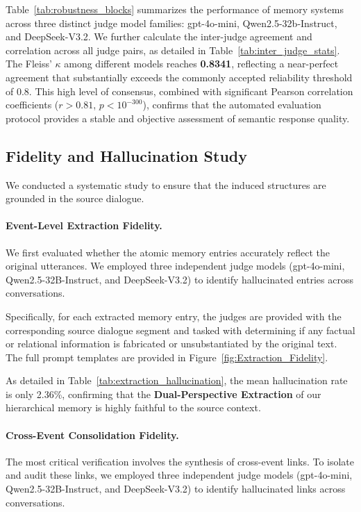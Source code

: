 Table~\ref{tab:robustness_blocks} summarizes the performance of memory systems across three distinct judge model families: gpt-4o-mini, Qwen2.5-32b-Instruct, and DeepSeek-V3.2. We further calculate the inter-judge agreement and correlation across all judge pairs, as detailed in Table~\ref{tab:inter_judge_stats}. The Fleiss' $\kappa$ among different models reaches \textbf{0.8341}, reflecting a near-perfect agreement that substantially exceeds the commonly accepted reliability threshold of 0.8. This high level of consensus, combined with significant Pearson correlation coefficients ($r > 0.81$, $p < 10^{-300}$), confirms that the automated evaluation protocol provides a stable and objective assessment of semantic response quality.

\subsection{Fidelity and Hallucination Study}\label{appendix:fidelity}

We conducted a systematic study to ensure that the induced structures are grounded in the source dialogue. 



\paragraph{Event-Level Extraction Fidelity.} We first evaluated whether the atomic memory entries  accurately reflect the original utterances. We employed three independent judge models (gpt-4o-mini, Qwen2.5-32B-Instruct, and DeepSeek-V3.2) to identify hallucinated entries across conversations. 

Specifically, for each extracted memory entry, the judges are provided with the corresponding source dialogue segment and tasked with determining if any factual or relational information is fabricated or unsubstantiated by the original text. The full prompt templates are provided in Figure~\ref{fig:Extraction_Fidelity}.

As detailed in Table~\ref{tab:extraction_hallucination}, the mean hallucination rate is only 2.36\%, confirming that the \textbf{Dual-Perspective Extraction} of our hierarchical memory is highly faithful to the source context. 



\paragraph{Cross-Event Consolidation Fidelity.} The most critical verification involves the synthesis of cross-event links. To isolate and audit these links, we employed three independent judge models (gpt-4o-mini, Qwen2.5-32B-Instruct, and DeepSeek-V3.2) to identify hallucinated links across conversations. 

